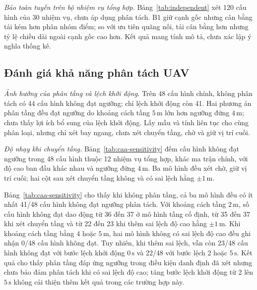 \documentclass[11pt,a4paper]{article}
\begin{document}
\begin{table}[H]
\centering
\caption{So sánh ba dạng hình học.}
\label{tab:geometry}
\small

\end{table}

\FloatBarrier
\noindent\textit{Bảo toàn tuyến trên bộ nhiệm vụ tổng hợp.}
Bảng~\ref{tab:independent} xét 120 cấu hình của 30 nhiệm vụ, chưa áp dụng phân tách. B1 giữ cạnh gốc nhưng cân bằng tải kém hơn phân nhóm điểm; so với ưu tiên quãng nối, tải cân bằng hơn nhưng tỷ lệ chiều dài ngoài cạnh gốc cao hơn. Kết quả mang tính mô tả, chưa xác lập ý nghĩa thống kê.

\begin{table}[H]
\centering
\caption{Kết quả trên 30 nhiệm vụ tổng hợp.}
\label{tab:independent}
\small

\end{table}

\FloatBarrier
\subsection{Đánh giá khả năng phân tách UAV}

\noindent\textit{Ảnh hưởng của phân tầng và lệch khởi động.}
Trên 48 cấu hình chính, không phân tách có 44 cấu hình không đạt ngưỡng; chỉ lệch khởi động còn 41. Hai phương án phân tầng đều đạt ngưỡng do khoảng cách tầng $5\,\mathrm{m}$ lớn hơn ngưỡng đứng $4\,\mathrm{m}$; chưa thấy lợi ích bổ sung của lệch khởi động. Lấy mẫu và tính liên tục cho cùng phân loại, nhưng chỉ xét bay ngang, chưa xét chuyển tầng, chờ và giữ vị trí cuối.

\noindent\textit{Độ nhạy khi chuyển tầng.}
Bảng~\ref{tab:caa-sensitivity} đếm cấu hình không đạt ngưỡng trong 48 cấu hình thuộc 12 nhiệm vụ tổng hợp, khác ma trận chính, với độ cao ban đầu khác nhau và ngưỡng đứng $4\,\mathrm{m}$. Ba mô hình đều xét chờ, giữ vị trí cuối; hai cột sau xét chuyển tầng không và có sai lệch hằng $\pm1\,\mathrm{m}$.

\begin{table}[H]
\centering
\caption{Độ nhạy phân tách theo mô hình quỹ đạo.}
\label{tab:caa-sensitivity}
\small

\end{table}

Bảng~\ref{tab:caa-sensitivity} cho thấy khi không phân tầng, cả ba mô hình đều có ít nhất 41/48 cấu hình không đạt ngưỡng phân tách. Với khoảng cách tầng $2\,\mathrm{m}$, số cấu hình không đạt dao động từ 36 đến 37 ở mô hình tầng cố định, từ 35 đến 37 khi xét chuyển tầng và từ 22 đến 23 khi thêm sai lệch độ cao hằng $\pm1\,\mathrm{m}$. Khi khoảng cách tầng bằng 4 hoặc $5\,\mathrm{m}$, hai mô hình không có sai lệch độ cao đều ghi nhận 0/48 cấu hình không đạt. Tuy nhiên, khi thêm sai lệch, vẫn còn 23/48 cấu hình không đạt với bước lệch khởi động $0\,\mathrm{s}$ và 22/48 với bước lệch 2 hoặc $5\,\mathrm{s}$. Kết quả cho thấy phân tầng đáp ứng ngưỡng trong điều kiện danh định đã xét nhưng chưa bảo đảm phân tách khi có sai lệch độ cao; tăng bước lệch khởi động từ 2 lên $5\,\mathrm{s}$ không cải thiện thêm kết quả trong các trường hợp này.
\end{document}
